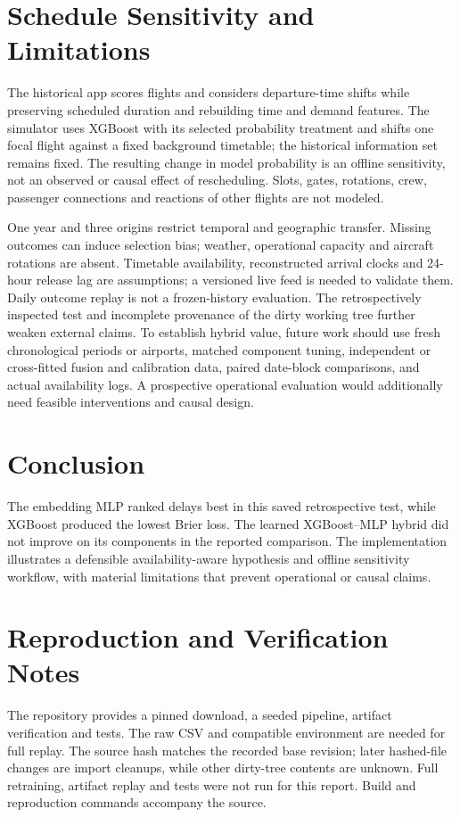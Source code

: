 \documentclass[conference]{IEEEtran}
\begin{document}
\section{Schedule Sensitivity and Limitations}
The historical app scores flights and considers departure-time shifts while preserving scheduled duration and rebuilding time and demand features. The simulator uses XGBoost with its selected probability treatment and shifts one focal flight against a fixed background timetable; the historical information set remains fixed. The resulting change in model probability is an offline sensitivity, not an observed or causal effect of rescheduling. Slots, gates, rotations, crew, passenger connections and reactions of other flights are not modeled.

One year and three origins restrict temporal and geographic transfer. Missing outcomes can induce selection bias; weather, operational capacity and aircraft rotations are absent. Timetable availability, reconstructed arrival clocks and 24-hour release lag are assumptions; a versioned live feed is needed to validate them. Daily outcome replay is not a frozen-history evaluation. The retrospectively inspected test and incomplete provenance of the dirty working tree further weaken external claims. To establish hybrid value, future work should use fresh chronological periods or airports, matched component tuning, independent or cross-fitted fusion and calibration data, paired date-block comparisons, and actual availability logs. A prospective operational evaluation would additionally need feasible interventions and causal design.
\section{Conclusion}
The embedding MLP ranked delays best in this saved retrospective test, while XGBoost produced the lowest Brier loss. The learned XGBoost--MLP hybrid did not improve on its components in the reported comparison. The implementation illustrates a defensible availability-aware hypothesis and offline sensitivity workflow, with material limitations that prevent operational or causal claims.
\appendices
\section{Reproduction and Verification Notes}
The repository provides a pinned download, a seeded pipeline, artifact verification and tests. The raw CSV and compatible environment are needed for full replay. The source hash matches the recorded base revision; later hashed-file changes are import cleanups, while other dirty-tree contents are unknown. Full retraining, artifact replay and tests were not run for this report. Build and reproduction commands accompany the source.


\clearpage
\onecolumn
\end{document}
